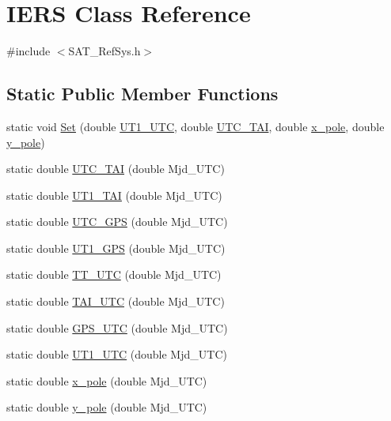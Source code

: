 \hypertarget{classIERS}{\section{I\-E\-R\-S Class Reference}
\label{classIERS}
}


{\ttfamily \#include $<$S\-A\-T\-\_\-\-Ref\-Sys.\-h$>$}

\subsection*{Static Public Member Functions}
\begin{DoxyCompactItemize}
\item 
static void \hyperlink{classIERS_ae1161daecc9629cdb716884cef9d1fa9}{Set} (double \hyperlink{classIERS_a2601a074a58e3c470db336bc1aea6791}{U\-T1\-\_\-\-U\-T\-C}, double \hyperlink{classIERS_ad872e267797cb8d5be328b236287565f}{U\-T\-C\-\_\-\-T\-A\-I}, double \hyperlink{classIERS_aa6619a8885c83540cf92a32510285edb}{x\-\_\-pole}, double \hyperlink{classIERS_a685869b1f1ac92c0595f8be01307a2ce}{y\-\_\-pole})
\item 
static double \hyperlink{classIERS_ad872e267797cb8d5be328b236287565f}{U\-T\-C\-\_\-\-T\-A\-I} (double Mjd\-\_\-\-U\-T\-C)
\item 
static double \hyperlink{classIERS_acfce0b1a43896fed7b1bf9cefe3baebd}{U\-T1\-\_\-\-T\-A\-I} (double Mjd\-\_\-\-U\-T\-C)
\item 
static double \hyperlink{classIERS_af3a179849d1bd691235472984ffa1995}{U\-T\-C\-\_\-\-G\-P\-S} (double Mjd\-\_\-\-U\-T\-C)
\item 
static double \hyperlink{classIERS_a64350c76a5faed69b9ac10b8ab3f869c}{U\-T1\-\_\-\-G\-P\-S} (double Mjd\-\_\-\-U\-T\-C)
\item 
static double \hyperlink{classIERS_abe17029c05804e5886ae14eae119c0f1}{T\-T\-\_\-\-U\-T\-C} (double Mjd\-\_\-\-U\-T\-C)
\item 
static double \hyperlink{classIERS_a2d0dcfa406b6f5c81ccbc71cb2cb5525}{T\-A\-I\-\_\-\-U\-T\-C} (double Mjd\-\_\-\-U\-T\-C)
\item 
static double \hyperlink{classIERS_a79c2d9fcfafe0c0d8cee4545e17af0f3}{G\-P\-S\-\_\-\-U\-T\-C} (double Mjd\-\_\-\-U\-T\-C)
\item 
static double \hyperlink{classIERS_a2601a074a58e3c470db336bc1aea6791}{U\-T1\-\_\-\-U\-T\-C} (double Mjd\-\_\-\-U\-T\-C)
\item 
static double \hyperlink{classIERS_aa6619a8885c83540cf92a32510285edb}{x\-\_\-pole} (double Mjd\-\_\-\-U\-T\-C)
\item 
static double \hyperlink{classIERS_a685869b1f1ac92c0595f8be01307a2ce}{y\-\_\-pole} (double Mjd\-\_\-\-U\-T\-C)
\end{DoxyCompactItemize}
